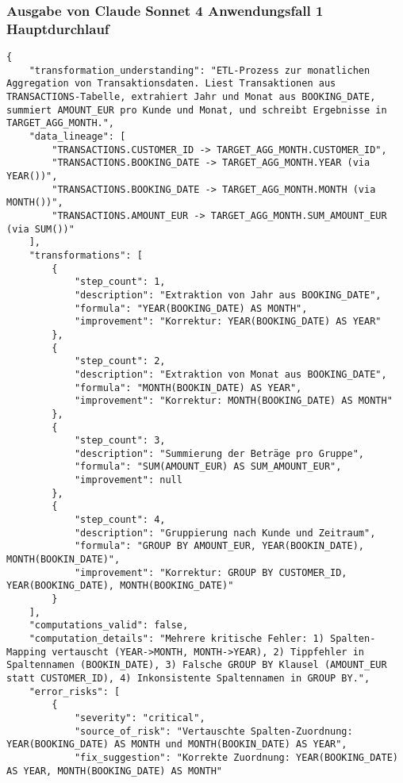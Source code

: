 \subsubsection{Ausgabe von Claude Sonnet 4 Anwendungsfall 1 Hauptdurchlauf}\label{anhang:subsubsec:claude_case1_prompt1}
\begin{lstlisting}[caption={Ausgabe: Claude Sonnet 4 Anwendungsfall 1 Hauptdurchlauf},label={claude_case1_prompt1}]
{
    "transformation_understanding": "ETL-Prozess zur monatlichen Aggregation von Transaktionsdaten. Liest Transaktionen aus TRANSACTIONS-Tabelle, extrahiert Jahr und Monat aus BOOKING_DATE, summiert AMOUNT_EUR pro Kunde und Monat, und schreibt Ergebnisse in TARGET_AGG_MONTH.",
    "data_lineage": [
        "TRANSACTIONS.CUSTOMER_ID -> TARGET_AGG_MONTH.CUSTOMER_ID",
        "TRANSACTIONS.BOOKING_DATE -> TARGET_AGG_MONTH.YEAR (via YEAR())",
        "TRANSACTIONS.BOOKING_DATE -> TARGET_AGG_MONTH.MONTH (via MONTH())",
        "TRANSACTIONS.AMOUNT_EUR -> TARGET_AGG_MONTH.SUM_AMOUNT_EUR (via SUM())"
    ],
    "transformations": [
        {
            "step_count": 1,
            "description": "Extraktion von Jahr aus BOOKING_DATE",
            "formula": "YEAR(BOOKING_DATE) AS MONTH",
            "improvement": "Korrektur: YEAR(BOOKING_DATE) AS YEAR"
        },
        {
            "step_count": 2,
            "description": "Extraktion von Monat aus BOOKING_DATE",
            "formula": "MONTH(BOOKIN_DATE) AS YEAR",
            "improvement": "Korrektur: MONTH(BOOKING_DATE) AS MONTH"
        },
        {
            "step_count": 3,
            "description": "Summierung der Beträge pro Gruppe",
            "formula": "SUM(AMOUNT_EUR) AS SUM_AMOUNT_EUR",
            "improvement": null
        },
        {
            "step_count": 4,
            "description": "Gruppierung nach Kunde und Zeitraum",
            "formula": "GROUP BY AMOUNT_EUR, YEAR(BOOKIN_DATE), MONTH(BOOKIN_DATE)",
            "improvement": "Korrektur: GROUP BY CUSTOMER_ID, YEAR(BOOKING_DATE), MONTH(BOOKING_DATE)"
        }
    ],
    "computations_valid": false,
    "computation_details": "Mehrere kritische Fehler: 1) Spalten-Mapping vertauscht (YEAR->MONTH, MONTH->YEAR), 2) Tippfehler in Spaltennamen (BOOKIN_DATE), 3) Falsche GROUP BY Klausel (AMOUNT_EUR statt CUSTOMER_ID), 4) Inkonsistente Spaltennamen in GROUP BY.",
    "error_risks": [
        {
            "severity": "critical",
            "source_of_risk": "Vertauschte Spalten-Zuordnung: YEAR(BOOKING_DATE) AS MONTH und MONTH(BOOKIN_DATE) AS YEAR",
            "fix_suggestion": "Korrekte Zuordnung: YEAR(BOOKING_DATE) AS YEAR, MONTH(BOOKING_DATE) AS MONTH"

\end{lstlisting}
